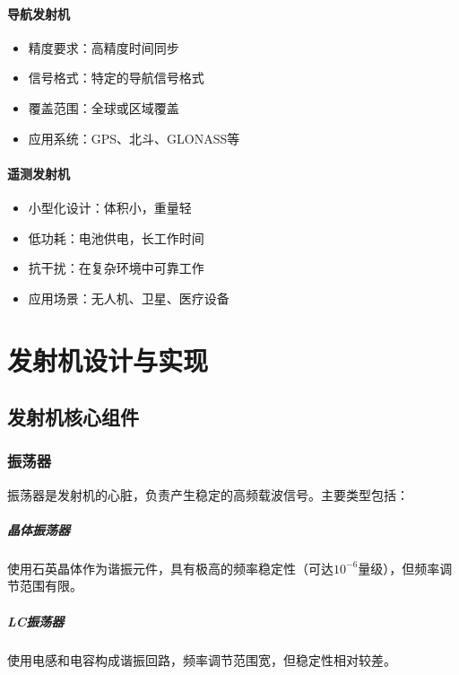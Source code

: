 \documentclass[12pt,UTF8]{ctexbook}
\begin{document}
\subsection{导航发射机}
\begin{itemize}[leftmargin=3.5em]
    \item 精度要求：高精度时间同步
    \item 信号格式：特定的导航信号格式
    \item 覆盖范围：全球或区域覆盖
    \item 应用系统：GPS、北斗、GLONASS等
\end{itemize}

\subsection{遥测发射机}
\begin{itemize}[leftmargin=3.5em]
    \item 小型化设计：体积小，重量轻
    \item 低功耗：电池供电，长工作时间
    \item 抗干扰：在复杂环境中可靠工作
    \item 应用场景：无人机、卫星、医疗设备
\end{itemize}

\part{发射机设计与实现}

\chapter{发射机核心组件}

\section{振荡器}

振荡器是发射机的心脏，负责产生稳定的高频载波信号。主要类型包括：

\subsubsection{晶体振荡器}
使用石英晶体作为谐振元件，具有极高的频率稳定性（可达$10^{-6}$量级），但频率调节范围有限。

\subsubsection{LC振荡器}
使用电感和电容构成谐振回路，频率调节范围宽，但稳定性相对较差。
\end{document}
